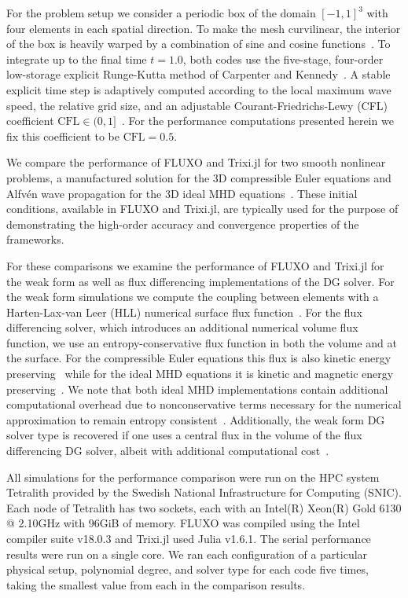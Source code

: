\documentclass[hidelinks]{juliacon} %
\newcommand{\trixi}{Trixi.jl\xspace}
\begin{document}
For the problem setup we consider a periodic box of the domain $[-1,1]^3$ with four elements in each
spatial direction. To make the mesh curvilinear, the interior of the box is heavily warped
by a combination of sine and cosine functions~\cite{chan2019efficient}. To integrate up to the
final time $t=1.0$, both codes use the five-stage, four-order low-storage explicit
Runge-Kutta method of Carpenter and Kennedy~\cite{CarpenterKennedy1994}.
A stable explicit time step is adaptively computed according to the local maximum wave
speed, the relative grid size, and an adjustable Courant-Friedrichs-Lewy (CFL)
coefficient $\text{CFL}\in(0,1]$~\cite{gassner2011}. For the performance computations presented herein
we fix this coefficient to be $\text{CFL}=0.5$.

We compare the performance of FLUXO and \trixi for two smooth nonlinear problems,
a manufactured solution for the 3D compressible Euler equations and Alfv\'{e}n wave propagation for
the 3D ideal MHD equations~\cite{gassner2009,altmann2012}. These initial conditions, available in FLUXO and
\trixi, are typically used for the purpose of demonstrating the high-order accuracy and convergence properties
of the frameworks.

For these comparisons we examine the performance of FLUXO and \trixi for the weak
form as well as flux differencing implementations of the DG solver. For the weak form simulations we compute
the coupling between elements with a Harten-Lax-van Leer (HLL) numerical surface flux function~\cite{Toro2009,li2005hllc}.
For the flux differencing solver, which introduces an additional numerical volume flux function, we use an entropy-conservative flux
function in both the volume and at the surface. For the compressible Euler equations
this flux is also kinetic energy preserving~\cite{ranocha2020icosahom, ranocha2018thesis}
while for the ideal MHD equations it is kinetic and magnetic energy preserving~\cite{hindenlang2019}. We note that both ideal MHD implementations
contain additional computational overhead due to nonconservative terms necessary for the numerical approximation
to remain entropy consistent~\cite{bohm2020}. Additionally, the weak form DG solver type is recovered if one uses a central flux
in the volume of the flux differencing DG solver, albeit with additional computational cost~\cite{gassner2016split}.

All simulations for the performance comparison were run on the HPC system Tetralith
provided by the Swedish National Infrastructure for Computing (SNIC).
Each node of Tetralith has two sockets, each with an Intel(R) Xeon(R) Gold 6130 @ 2.10GHz with 96GiB of memory.
FLUXO was compiled using the Intel compiler suite v18.0.3 and \trixi used Julia v1.6.1.
The serial performance results were run on a single core.
We ran each configuration of a particular physical setup, polynomial degree, and solver type
for each code five times, taking the smallest value from each in the comparison results.
\end{document}
